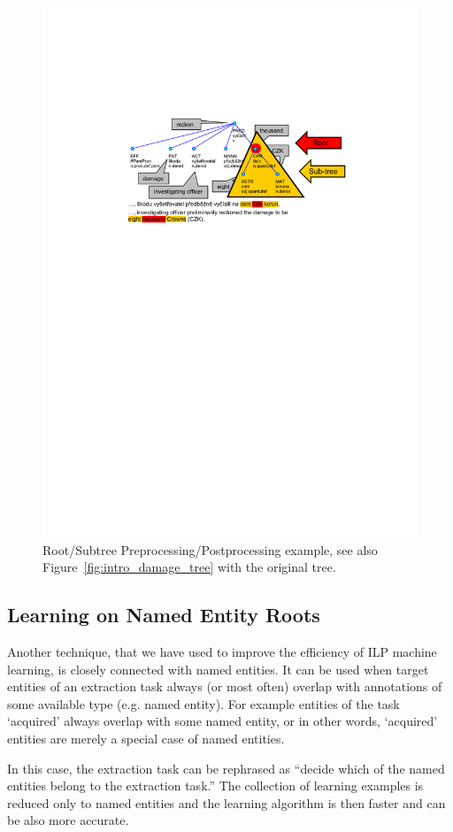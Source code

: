 \begin{figure}
	\centering
		\includegraphics[width=0.85\hsize]{tree-subtree}
	\caption[Root/Subtree Preprocessing/Postprocessing example.]{Root/Subtree Preprocessing/Postprocessing example, see also Figure~\ref{fig:intro_damage_tree} with the original tree.}
	\label{fig:tree-subtree}
\end{figure}


\subsection{Learning on Named Entity Roots} \label{sec:learning_ne_roots}
Another technique, that we have used to improve the efficiency of ILP machine learning, is closely connected with named entities. It can be used when target entities of an extraction task always (or most often) overlap with annotations of some available type (e.g. named entity). For example entities of the task `acquired' always overlap with some named entity, or in other words, `acquired' entities are merely a special case of named entities.

In this case, the extraction task can be rephrased as ``decide which of the named entities belong to the extraction task.'' The collection of learning examples is reduced only to named entities and the learning algorithm is then faster and can be also more accurate.

